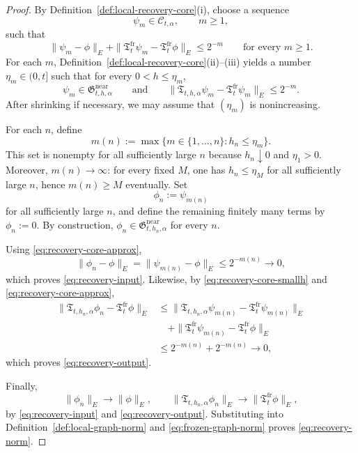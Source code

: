 \documentclass[11pt,a4paper]{amsart}
\theoremstyle{plain}
\theoremstyle{definition}
\theoremstyle{remark}
\begin{document}
\begin{proof}
By Definition~\ref{def:local-recovery-core}(i), choose a sequence
\[
\psi_m\in\mathcal C_{t,\alpha},
\qquad m\ge1,
\]
such that
\begin{equation}\label{eq:recovery-core-approx}
\|\psi_m-\phi\|_E+\|\mathfrak T_t^{\mathrm{fr}}\psi_m-\mathfrak T_t^{\mathrm{fr}}\phi\|_E
\le 2^{-m}
\qquad\text{for every }m\ge1.
\end{equation}
For each \(m\), Definition~\ref{def:local-recovery-core}(ii)--(iii) yields a number
\(\eta_m\in(0,t]\) such that for every \(0<h\le \eta_m\),
\begin{equation}\label{eq:recovery-core-smallh}
\psi_m\in \mathfrak G_{t,h,\alpha}^{\mathrm{near}}
\qquad\text{and}\qquad
\|\mathfrak T_{t,h,\alpha}\psi_m-\mathfrak T_t^{\mathrm{fr}}\psi_m\|_E\le 2^{-m}.
\end{equation}
After shrinking if necessary, we may assume that \((\eta_m)\) is nonincreasing.

For each \(n\), define
\[
m(n):=\max\{m\in\{1,\dots,n\}: h_n\le \eta_m\}.
\]
This set is nonempty for all sufficiently large \(n\) because \(h_n\downarrow0\) and
\(\eta_1>0\). Moreover, \(m(n)\to\infty\): for every fixed \(M\), one has
\(h_n\le \eta_M\) for all sufficiently large \(n\), hence \(m(n)\ge M\) eventually. Set
\[
\phi_n:=\psi_{m(n)}
\]
for all sufficiently large \(n\), and define the remaining finitely many terms by \(\phi_n:=0\).
By construction,
\(\phi_n\in \mathfrak G_{t,h_n,\alpha}^{\mathrm{near}}\) for every \(n\).

Using \eqref{eq:recovery-core-approx},
\[
\|\phi_n-\phi\|_E
=
\|\psi_{m(n)}-\phi\|_E
\le 2^{-m(n)}
\longrightarrow 0,
\]
which proves \eqref{eq:recovery-input}. Likewise, by
\eqref{eq:recovery-core-smallh} and \eqref{eq:recovery-core-approx},
\begin{align*}
\|\mathfrak T_{t,h_n,\alpha}\phi_n-\mathfrak T_t^{\mathrm{fr}}\phi\|_E
&\le
\|\mathfrak T_{t,h_n,\alpha}\psi_{m(n)}-\mathfrak T_t^{\mathrm{fr}}\psi_{m(n)}\|_E \\
&\quad+
\|\mathfrak T_t^{\mathrm{fr}}\psi_{m(n)}-\mathfrak T_t^{\mathrm{fr}}\phi\|_E \\
&\le 2^{-m(n)}+2^{-m(n)}
\longrightarrow 0,
\end{align*}
which proves \eqref{eq:recovery-output}.

Finally,
\[
\|\phi_n\|_E\to\|\phi\|_E,
\qquad
\|\mathfrak T_{t,h_n,\alpha}\phi_n\|_E\to\|\mathfrak T_t^{\mathrm{fr}}\phi\|_E,
\]
by \eqref{eq:recovery-input} and \eqref{eq:recovery-output}. Substituting into
Definition~\ref{def:local-graph-norm} and \eqref{eq:frozen-graph-norm} proves
\eqref{eq:recovery-norm}.
\end{proof}
\end{document}
